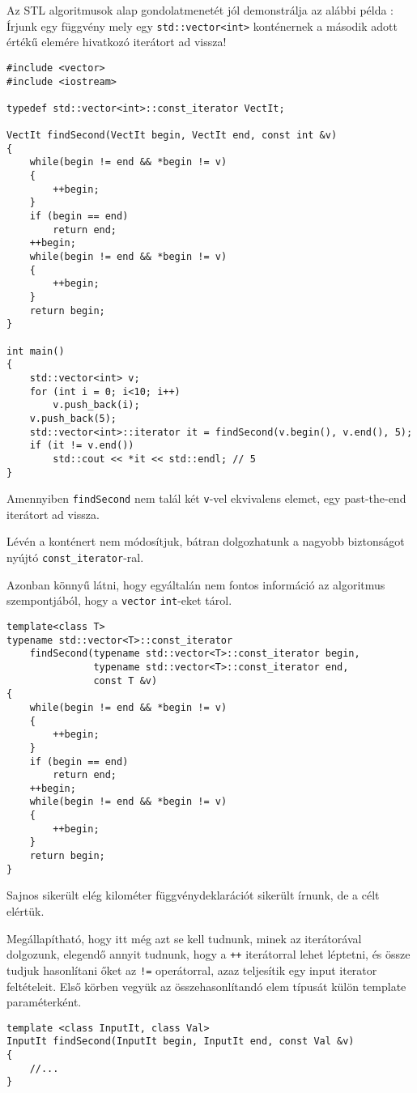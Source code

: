 \documentclass[a4paper,11.5pt,table]{article}
\begin{document}
	Az STL algoritmusok alap gondolatmenetét jól demonstrálja az alábbi példa : Írjunk egy függvény mely egy \texttt{std::vector<int>} konténernek a második adott értékű elemére hivatkozó iterátort ad vissza!
	\begin{lstlisting}
#include <vector>
#include <iostream>

typedef std::vector<int>::const_iterator VectIt;

VectIt findSecond(VectIt begin, VectIt end, const int &v)
{
	while(begin != end && *begin != v)
	{
		++begin;
	}
	if (begin == end)
		return end;
	++begin;
	while(begin != end && *begin != v)
	{
		++begin;
	}
	return begin;
}

int main()
{
	std::vector<int> v;
	for (int i = 0; i<10; i++)
		v.push_back(i);
	v.push_back(5);
	std::vector<int>::iterator it = findSecond(v.begin(), v.end(), 5);
	if (it != v.end())
		std::cout << *it << std::endl; // 5
}
	\end{lstlisting}
	Amennyiben \texttt{findSecond} nem talál két \texttt{v}-vel ekvivalens elemet, egy past-the-end iterátort ad vissza.
	\begin{note}
		Lévén a konténert nem módosítjuk, bátran dolgozhatunk a nagyobb biztonságot nyújtó \texttt{const\_iterator}-ral.
	\end{note}
	Azonban könnyű látni, hogy egyáltalán nem fontos információ az algoritmus szempontjából, hogy a \texttt{vector} \texttt{int}-eket tárol.
	\begin{lstlisting}
template<class T>
typename std::vector<T>::const_iterator 
	findSecond(typename std::vector<T>::const_iterator begin, 
			   typename std::vector<T>::const_iterator end, 
			   const T &v)
{
	while(begin != end && *begin != v)
	{
		++begin;
	}
	if (begin == end)
		return end;
	++begin;
	while(begin != end && *begin != v)
	{
		++begin;
	}
	return begin;
}
	\end{lstlisting}
	Sajnos sikerült elég kilométer függvénydeklarációt sikerült írnunk, de a célt elértük.
	
	\smallskip
	Megállapítható, hogy itt még azt se kell tudnunk, minek az iterátorával dolgozunk, elegendő annyit tudnunk, hogy a \texttt{++} iterátorral lehet léptetni, és össze tudjuk hasonlítani őket az \texttt{!=} operátorral, azaz teljesítik egy input iterator feltételeit. Első körben vegyük az összehasonlítandó elem típusát külön template paraméterként.
	\begin{lstlisting}
template <class InputIt, class Val>
InputIt findSecond(InputIt begin, InputIt end, const Val &v)
{
	//...
}
	\end{lstlisting}
	
\end{document}
